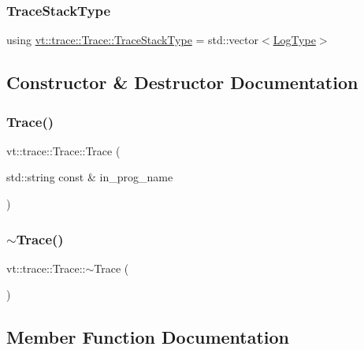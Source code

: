 \subsubsection{\texorpdfstring{Trace\+Stack\+Type}{TraceStackType}}
{\footnotesize\ttfamily using \hyperlink{structvt_1_1trace_1_1_trace_af27d223028d10a196680513defcef3d6}{vt\+::trace\+::\+Trace\+::\+Trace\+Stack\+Type} =  std\+::vector$<$\hyperlink{structvt_1_1trace_1_1_trace_a43306d96a91e49db081eaea016f1dd0a}{Log\+Type}$>$}



\subsection{Constructor \& Destructor Documentation}
\mbox{\label{structvt_1_1trace_1_1_trace_a2b736f560ee446cbd84aaf96e25c8d0b}} 
\subsubsection{\texorpdfstring{Trace()}{Trace()}}
{\footnotesize\ttfamily vt\+::trace\+::\+Trace\+::\+Trace (\begin{DoxyParamCaption}\item[{std\+::string const \&}]{in\+\_\+prog\+\_\+name }\end{DoxyParamCaption})}

\mbox{\label{structvt_1_1trace_1_1_trace_a80b3426aed07572525ef4834b0c4dedd}} 
\subsubsection{\texorpdfstring{$\sim$\+Trace()}{~Trace()}}
{\footnotesize\ttfamily vt\+::trace\+::\+Trace\+::$\sim$\+Trace (\begin{DoxyParamCaption}{ }\end{DoxyParamCaption})\hspace{0.3cm}{\ttfamily [virtual]}}



\subsection{Member Function Documentation}
\mbox{\label{structvt_1_1trace_1_1_trace_abc497f6fa641ac1c2c20889815b06dbc}} 
